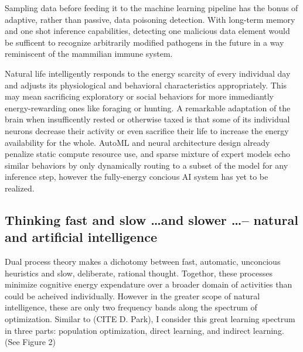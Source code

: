 Sampling data before feeding it to the machine learning pipeline has the bonus of adaptive, rather than passive, data poisoning detection. With long-term memory and one shot inference capabilities, detecting one malicious data element would be sufficent to recognize arbitrarily modified pathogens in the future in a way reminiscent of the mammilian immune system.

Natural life intelligently responds to the energy scarcity of every individual day and adjusts its physiological and behavioral characteristics appropriately. This may mean sacrificing exploratory or social behaviors for more immediantly energy-rewarding ones like foraging or hunting. A remarkable adaptation of the brain when insufficently rested or otherwise taxed is that some of its individual neurons decrease their activity or even sacrifice their life to increase the energy availability for the whole. AutoML and neural architecture design already penalize static compute resource use, and sparse mixture of expert models echo similar behaviors by only dynamically routing to a subset of the model for any inference step, however the fully-energy concious AI system has yet to be realized.
    
\subsection{Thinking fast and slow \dots and slower \dots -- natural and artificial intelligence}

Dual process theory makes a dichotomy between fast, automatic, unconcious heuristics and slow, deliberate, rational thought. Togethor, these processes minimize cognitive energy expendature over a broader domain of activities than could be acheived individually. However in the greater scope of natural intelligence, these are only two frequency bands along the spectrum of optimization. Similar to (CITE D. Park), I consider this great learning spectrum in three parts: population optimization, direct learning, and indirect learning. (See Figure 2)

